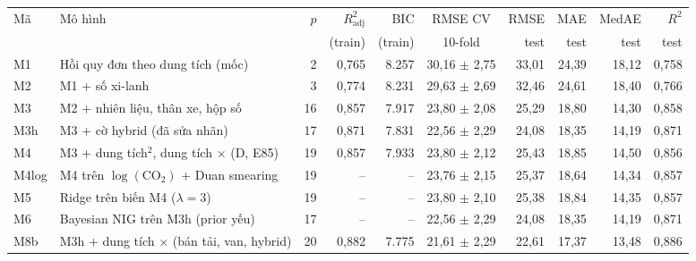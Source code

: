 \begin{tabular}{@{}l >{\raggedright\arraybackslash}p{4.1cm} r r r c r r r r@{}}
\toprule
Mã & Mô hình & $p$ & $R^2_{\mathrm{adj}}$ & BIC & RMSE CV & RMSE & MAE & MedAE & $R^2$ \\
 & & & (train) & (train) & 10-fold & test & test & test & test \\
\midrule
M1 & Hồi quy đơn theo dung tích (mốc) & 2 & 0,765 & 8.257 & 30,16 $\pm$ 2,75 & 33,01 & 24,39 & 18,12 & 0,758 \\
M2 & M1 + số xi-lanh & 3 & 0,774 & 8.231 & 29,63 $\pm$ 2,69 & 32,46 & 24,61 & 18,40 & 0,766 \\
M3 & M2 + nhiên liệu, thân xe, hộp số & 16 & 0,857 & 7.917 & 23,80 $\pm$ 2,08 & 25,29 & 18,80 & 14,30 & 0,858 \\
M3h & M3 + cờ hybrid (đã sửa nhãn) & 17 & 0,871 & 7.831 & 22,56 $\pm$ 2,29 & 24,08 & 18,35 & 14,19 & 0,871 \\
M4 & M3 + dung tích$^2$, dung tích $\times$ (D, E85) & 19 & 0,857 & 7.933 & 23,80 $\pm$ 2,12 & 25,43 & 18,85 & 14,50 & 0,856 \\
M4log & M4 trên $\log(\text{CO}_2)$ + Duan smearing & 19 & -- & -- & 23,76 $\pm$ 2,15 & 25,37 & 18,64 & 14,34 & 0,857 \\
M5 & Ridge trên biến M4 ($\lambda = 3$) & 19 & -- & -- & 23,80 $\pm$ 2,10 & 25,38 & 18,84 & 14,35 & 0,857 \\
M6 & Bayesian NIG trên M3h (prior yếu) & 17 & -- & -- & 22,56 $\pm$ 2,29 & 24,08 & 18,35 & 14,19 & 0,871 \\
M8b & M3h + dung tích $\times$ (bán tải, van, hybrid) & 20 & 0,882 & 7.775 & 21,61 $\pm$ 2,29 & 22,61 & 17,37 & 13,48 & 0,886 \\
\bottomrule
\end{tabular}
